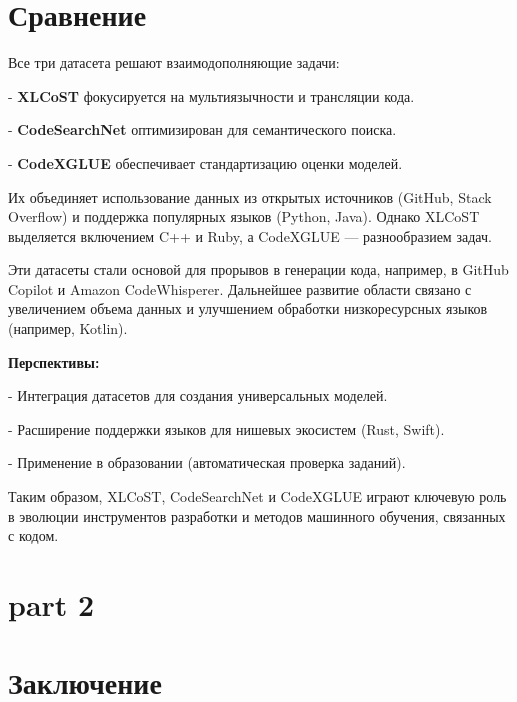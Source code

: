 \documentclass[14pt]{article}
\theoremstyle{definition}
\begin{document}
\newpage

\section{Сравнение}
Все три датасета решают взаимодополняющие задачи:

    
- \textbf{XLCoST} фокусируется на мультиязычности и трансляции кода.
    
- \textbf{CodeSearchNet} оптимизирован для семантического поиска.
    
- \textbf{CodeXGLUE} обеспечивает стандартизацию оценки моделей.


Их объединяет использование данных из открытых источников (GitHub, Stack Overflow) и поддержка популярных языков (Python, Java). Однако XLCoST выделяется включением C++ и Ruby, а CodeXGLUE — разнообразием задач.

Эти датасеты стали основой для прорывов в генерации кода, например, в GitHub Copilot и Amazon CodeWhisperer. Дальнейшее развитие области связано с увеличением объема данных и улучшением обработки низкоресурсных языков (например, Kotlin).

\textbf{Перспективы:}

    
- Интеграция датасетов для создания универсальных моделей.
    
- Расширение поддержки языков для нишевых экосистем (Rust, Swift).
    
- Применение в образовании (автоматическая проверка заданий).


Таким образом, XLCoST, CodeSearchNet и CodeXGLUE играют ключевую роль в эволюции инструментов разработки и методов машинного обучения, связанных с кодом.



\newpage
 \section{part 2}
 
 
 




\newpage
\section{Заключение}
\end{document}
